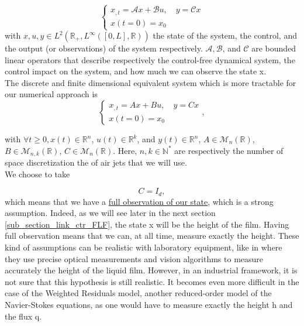 \documentclass[12pt]{article}
\begin{document}
\begin{equation}\label{Ctrl_framework_continuous}
    \left\{ 
    \begin{aligned}
        x_{,t} = \mathcal{A}x+\mathcal{B}u, \quad y=\mathcal{C}x\\
        x(t=0) = x_0
    \end{aligned}
    \right.
\end{equation}
with $x, u, y\in L^{2}(\mathbb{R}_+, L^{\infty}([0,L],\mathbb{R}))$ the state of the system, the control, and the output 
(or observations) of the system respectively. $\mathcal{A}, \mathcal{B}$, and $\mathcal{C}$ are bounded linear operators 
that describe respectively the control-free dynamical system, the control impact on the system, and how much we can observe the state x.
\\ 

The discrete and finite dimensional equivalent system which is more tractable for our numerical approach is 
\begin{equation}\label{Ctrl_framework_discrete}
    \left\{ 
    \begin{aligned}
        x_{,t} = Ax+Bu, \quad y=Cx\\
        x(t=0) = x_0
    \end{aligned}
    \right.,
\end{equation}

with $\forall t\geq 0, x(t)\in \mathbb{R}^n$, $u(t)\in \mathbb{R}^k$, and $y(t) \in \mathbb{R}^n$, 
$A \in \mathcal{M}_{n}(\mathbb{R})$, $B \in \mathcal{M}_{n, k}(\mathbb{R})$, $C \in \mathcal{M}_{n}(\mathbb{R})$. 
Here, $n,k \in  \mathbb{N}^*$ are respectively the number of space discretization the of air jets that we will use. \\

We choose to take 

\begin{equation}
    C = I_d,
\end{equation}
which means that we have a \underline{ full observation of our state}, which is a strong assumption. Indeed, as we will 
see later in the next section \ref{sub_section_link_ctr_FLF}, the state x will be the height of the film. Having full 
observation means that we can, at all time, measure exactly the height. These kind of assumptions can be realistic with 
laboratory equipment, like in \cite{experimental_paper} where they use precise optical measurements and vision algorithms 
to measure accurately the height of the liquid film. However, in an industrial framework, it is not sure that this hypothesis
 is still realistic. It becomes even more difficult in the case of the Weighted Residuals model, another reduced-order model of 
 the Navier-Stokes equations, as one would have to measure exactly the height h and the flux q. 
\\
\end{document}
